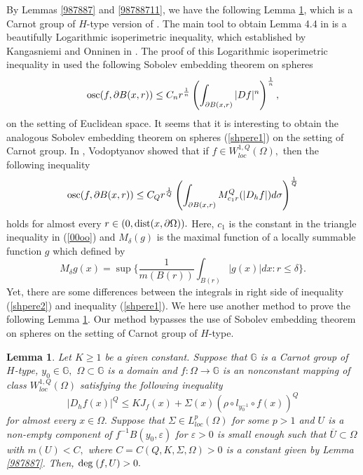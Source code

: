 \documentclass[11pt,twoside]{article}
\newtheorem{lem}[thm]{Lemma}
\theoremstyle{definition}
\theoremstyle{remark}
\begin{document}
By Lemmas \ref{987887} and \ref{98788711}, we have the following Lemma \ref{lemma000829992}, which is a Carnot group of $H$-type version of \cite[Lemma 4.4]{KO222}. The main tool to obtain Lemma 4.4 in \cite{KO222} is a beautifully Logarithmic isoperimetric inequality, which established by  Kangasniemi and Onninen in \cite[Lemma 6.1]{KO221}.  The proof of this Logarithmic isoperimetric inequality
in \cite[Lemma 6.1]{KO221} used  the following Sobolev embedding theorem on spheres 
\begin{equation}\label{shpere1}
{\rm osc}(f,\partial B(x,r))\leq C_{n}r^{\frac{1}{n}}\left(\int_{\partial B(x,r)}\vert Df\vert^{n}\right)^{\frac{1}{n}},
\end{equation}
  on the setting of Euclidean space. It seems that 
 it is interesting to obtain the analogous Sobolev embedding theorem on spheres (\ref{shpere1}) on the setting of Carnot group. In \cite[Corollary  1]{Vod96},  Vodoptyanov showed that if  
 $f\in W_{loc}^{1,Q}(\Omega),$ then the following inequality
 \begin{equation}\label{shpere2}
{\rm osc}(f,\partial B(x,r))\leq C_{Q}r^{\frac{1}{Q}}\left(\int_{\partial B(x,r)}M_{c_{1} r}^{Q}(\vert D_{h}f\vert)d\sigma\right)^{\frac{1}{Q}}
\end{equation}
  holds for almost every $r\in(0,{\rm dist}(x,\partial\Omega)).$ Here, $c_{1}$ is the constant in the triangle inequality in (\ref{00oo}) and $M_{\delta}(g)$ is the maximal function of a locally summable function $g$ which  defined by
 $$M_{\delta}g(x)=\sup\Bigg\{\frac{1}{m(B(r))}\int_{B(r)}\vert g(x)\vert dx: r\leq\delta\Bigg\}.$$
 Yet, there are some differences between the integrals in right side of inequality  (\ref{shpere2}) and inequality  (\ref{shpere1}). We here use another  method  to prove the following Lemma \ref{lemma000829992}. Our method bypasses the use of  Sobolev embedding theorem on spheres on the setting of Carnot group of $H$-type.
\begin{lem} \label{lemma000829992}
 Let $K\geq1$ be a given constant. Suppose that $\mathbb{G}$ is a Carnot group of $H$-type,  $y_{0}\in\mathbb{G},$ $\Omega\subset\mathbb{G}$ is a domain and $f:\Omega\rightarrow \mathbb{G}$ is an nonconstant mapping of class $W_{loc}^{1,Q}(\Omega)$ satisfying  the following inequality
$$\vert D_{h}f(x)\vert^{Q}\leq KJ_{f}(x)+\Sigma(x)(\rho\circ l_{y_{0}^{-1}}\circ f(x))^{Q}$$
for almost every $x\in\Omega.$ Suppose that $\Sigma\in L_{loc}^{p}(\Omega)$ for some $p>1$  and $U$ is a non-empty component of $f^{-1}B(y_{0},\varepsilon)$ for $\varepsilon>0$ is small enough such that $\overline{U}\subset\Omega$ with $m(U)<C,$ where $C=C(Q,K,\Sigma,\Omega)>0$ is a constant given by Lemma \ref{987887}. Then, ${\rm deg}\;(f,U)>0.$
\end{lem}
\end{document}
